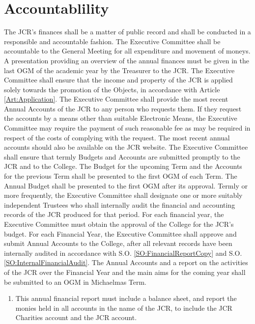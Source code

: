 \section{Accountablility}
\npara The JCR's finances shall be a matter of public record and shall be conducted in a responsible and accountable fashion.  The Executive Committee shall be accountable to the General Meeting for all expenditure and movement of moneys. A presentation providing an overview of the annual finances must be given in the last OGM of the academic year by the Treasurer to the JCR.
\npara The Executive Committee shall ensure that the income and property of the JCR is applied solely towards the promotion of the Objects, in accordance with Article \ref{Art:Application}.
\npara \label{SO:AnnualAccountProvision} The Executive Committee shall provide the most recent Annual Accounts of the JCR to any person who requests them.  If they request the accounts by a means other than suitable Electronic Means, the Executive Committee may require the payment of such reasonable fee as may be required in respect of the costs of complying with the request. The most recent annual accounts should also be available on the JCR website.
\npara \label{SO:TermlyBudget} The Executive Committee shall ensure that termly Budgets and Accounts are submitted promptly to the JCR and to the College. The Budget for the upcoming Term and the Accounts for the previous Term shall be presented to the first OGM of each Term.  The Annual Budget shall be presented to the first OGM after its approval.
\npara \label{SO:InternalFinancialAudit} Termly or more frequently, the Executive Committee shall designate one or more suitably independent Trustees who shall internally audit the financial and accounting records of the JCR produced for that period.
\npara For each financial year, the Executive Committee must obtain the approval of the College for the JCR's budget. 
\npara For each Financial Year, the Executive Committee shall approve and submit Annual Accounts to the College, after all relevant records have been internally audited in accordance with S.O. \ref{SO:FinancialReportCopy} and S.O. \ref{SO:InternalFinancialAudit}.  The Annual Accounts and a report on the activities of the JCR over the Financial Year and the main aims for the coming year shall be submitted to an OGM in Michaelmas Term.
\begin{enumerate}
    \item This annual financial report must include a balance sheet, and report the monies held in all accounts in the name of the JCR, to include the JCR Charities account and the JCR account.
\end{enumerate}
